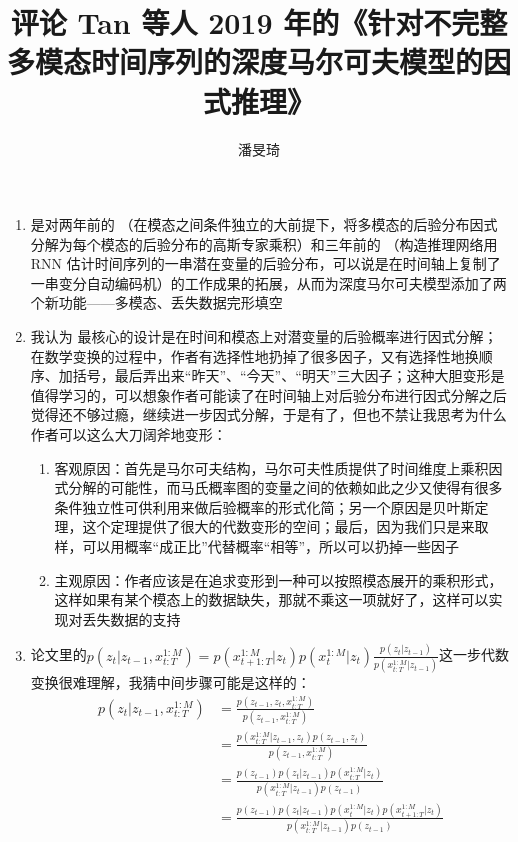 \documentclass[11pt]{article}
\title{评论 Tan 等人 2019 年的《针对不完整多模态时间序列的深度马尔可夫模型的因式推理》}
\author{\zhtoday}
\date{潘旻琦}
\begin{document}
\maketitle

\begin{enumerate}
\item \cite{Tan2019FactorizedII} 是对两年前的 \cite{NIPS2018_7801}（在模态之间条件独立的大前提下，将多模态的后验分布因式分解为每个模态的后验分布的高斯专家乘积）和三年前的 \cite{krishnan2017structured}（构造推理网络用 RNN 估计时间序列的一串潜在变量的后验分布，可以说是在时间轴上复制了一串变分自动编码机）的工作成果的拓展，从而为深度马尔可夫模型添加了两个新功能——多模态、丢失数据完形填空
\item 我认为 \cite{Tan2019FactorizedII} 最核心的设计是在时间和模态上对潜变量的后验概率进行因式分解；在数学变换的过程中，作者有选择性地扔掉了很多因子，又有选择性地换顺序、加括号，最后弄出来``昨天''、``今天''、``明天''三大因子；这种大胆变形是值得学习的，可以想象作者可能读了\cite{krishnan2017structured}在时间轴上对后验分布进行因式分解之后觉得还不够过瘾，继续进一步因式分解，于是有了\cite{Tan2019FactorizedII}，但也不禁让我思考为什么作者可以这么大刀阔斧地变形：
\begin{enumerate}
\item 客观原因：首先是马尔可夫结构，马尔可夫性质提供了时间维度上乘积因式分解的可能性，而马氏概率图的变量之间的依赖如此之少又使得有很多条件独立性可供利用来做后验概率的形式化简；另一个原因是贝叶斯定理，这个定理提供了很大的代数变形的空间；最后，因为我们只是来取样，可以用概率``成正比''代替概率``相等''，所以可以扔掉一些因子
\item 主观原因：作者应该是在追求变形到一种可以按照模态展开的乘积形式，这样如果有某个模态上的数据缺失，那就不乘这一项就好了，这样可以实现对丢失数据的支持
\end{enumerate}
\item 论文里的$p(z_t|z_{t-1},x_{t:T}^{1:M})=p(x_{t+1:T}^{1:M}|z_t)p(x_t^{1:M}|z_t)\frac{p(z_t|z_{t-1})}{p(x_{t:T}^{1:M}|z_{t-1})}$这一步代数变换很难理解，我猜中间步骤可能是这样的：\[
\begin{split}
p(z_t|z_{t-1},x_{t:T}^{1:M})&=\frac{p(z_{t-1},z_{t},x_{t:T}^{1:M})}{p(z_{t-1},x_{t:T}^{1:M})}\\
&=\frac{p(x_{t:T}^{1:M}|z_{t-1},z_{t})p(z_{t-1},z_{t})}{p(z_{t-1},x_{t:T}^{1:M})}\\
&=\frac{p(z_{t-1})p(z_t|z_{t-1})p(x_{t:T}^{1:M}|z_t)}{p(x_{t:T}^{1:M}|z_{t-1})p(z_{t-1})}\\
&=\frac{p(z_{t-1})p(z_t|z_{t-1})p(x_t^{1:M}|z_t)p(x_{t+1:T}^{1:M}|z_t)}{p(x_{t:T}^{1:M}|z_{t-1})p(z_{t-1})}\\

\end{split}\]
\end{enumerate}
\end{document}
